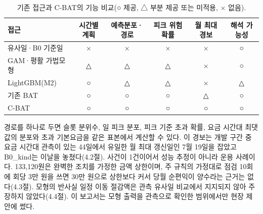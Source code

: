 \begin{table}[htbp]
\centering
\hwptablefont
\setlength{\tabcolsep}{4pt}
\caption{기존 접근과 C-BAT의 기능 비교(○ 제공, △ 부분 제공 또는 미적용, $\times$ 없음).}\label{tab:ch5-compare}
\begin{tabular}{L{3.8cm}ccccc}
\toprule
접근 & 시간별 계획 & 예측분포·경로 & 피크 위험확률 & 월 최대 경보 & 해석 가능성 \\
\midrule
유사일·B0 기준일 & $\times$ & $\times$ & $\times$ & $\times$ & ○ \\
GAM·평활 가법모형 & △ & △ & △ & $\times$ & ○ \\
LightGBM(M2) & ○ & △ & △ & $\times$ & △ \\
기존 BAT & ○ & ○ & ○ & △ & ○ \\
C-BAT & ○ & ○ & ○ & ○ & ○ \\
\bottomrule
\end{tabular}
\end{table}

경로를 하나로 두면 슬롯 분위수, 일 피크 분포, 피크 기준 초과 확률, 요금 시간대 최댓값의 분포와 초과 기본요금을 같은 표본에서 계산할 수 있다. 이 경보는 개발 구간 중 요금 시간대 관측이 있는 44일에서 유일한 월 최대 갱신일인 7월 19일을 잡았고 B0\_kind는 이날을 놓쳤다(4.2절). 사건이 1건이어서 성능 추정이 아니라 운용 사례이다. 133,120원은 완벽한 조치를 가정한 금액 상한이며, 주 규칙의 가정대로 점검 10회에 회당 3만 원을 쓰면 30만 원으로 상한보다 커서 당월 순편익이 양수라는 근거는 없다(4.3절). 모형의 반사실 일정 이동 절감액은 관측 유사일 비교에서 지지되지 않아 주장하지 않았다(4.4절). 이 보고서는 모형 출력을 관측으로 확인한 범위에서만 현장 제안에 썼다.

